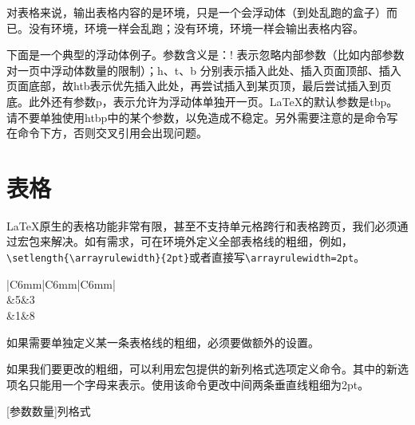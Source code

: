 对表格来说，输出表格内容的是环境，只是一个会浮动体（到处乱跑的盒子）而已。没有环境，环境一样会乱跑；没有环境，环境一样会输出表格内容。

下面是一个典型的浮动体例子。参数含义是：! 表示忽略内部参数（比如内部参数对一页中浮动体数量的限制）；h、t、b 分别表示插入此处、插入页面顶部、插入页面底部，故htb表示优先插入此处，再尝试插入到某页顶，最后尝试插入到页底。此外还有参数p，表示允许为浮动体单独开一页。\LaTeX 的默认参数是tbp。请不要单独使用htbp中的某个参数，以免造成不稳定。另外需要注意的是命令写在命令下方，否则交叉引用会出现问题。


\section{表格}
\LaTeX 原生的表格功能非常有限，甚至不支持单元格跨行和表格跨页，我们必须通过宏包来解决。如有需求，可在环境外定义全部表格线的粗细，例如，\verb|\setlength{\arrayrulewidth}{2pt}|或者直接写\verb|\arrayrulewidth=2pt|。

\begin{codeshow}
\centering
\arrayrulewidth=1pt%
\begin{tabular}
	{|C{6mm}|C{6mm}|C{6mm}|}
	\hline
	\\
	&5&3\\
	&1&8\\
	\hline
\end{tabular}
\end{codeshow}

如果需要单独定义某一条表格线的粗细，必须要做额外的设置。

如果我们要更改的粗细，可以利用宏包提供的新列格式选项定义命令。其中的新选项名只能用一个字母来表示。使用该命令更改中间两条垂直线粗细为2pt。

\begin{latex}{}
\newcolumntype{新选项名称}[参数数量]{列格式}
\end{latex}

